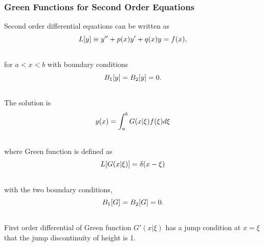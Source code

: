 \documentclass[letterpaper,10pt,english]{sphinxmanual}
\begin{document}
\subsubsection{Green Functions for Second Order Equations}
\label{vocabulary/green:index-0}\label{vocabulary/green:green-functions-for-second-order-equations}
Second order differential equations can be written as
\begin{gather}
\begin{split}L[y] \equiv y'' + p(x) y' + q(x) y = f(x),\end{split}\notag\\\begin{split}\end{split}\notag
\end{gather}
for $a<x<b$ with boundary conditions
\begin{gather}
\begin{split}B_1[y] = B_2[y] = 0.\end{split}\notag\\\begin{split}\end{split}\notag
\end{gather}
The solution is
\begin{gather}
\begin{split}y(x) = \int _a ^b G(x\vert \xi) f(\xi) d\xi\end{split}\notag\\\begin{split}\end{split}\notag
\end{gather}
where Green function is defined as
\begin{gather}
\begin{split}L[G(x\vert \xi)] = \delta(x-\xi)\end{split}\notag\\\begin{split}\end{split}\notag
\end{gather}
with the two boundary conditions,
\begin{gather}
\begin{split}B_1[G] = B_2[G] = 0.\end{split}\notag\\\begin{split}\end{split}\notag
\end{gather}
First order differential of Green function $G'(x\vert \xi)$ has a jump condition at $x=\xi$ that the jump discontinuity of height is 1.
\end{document}
